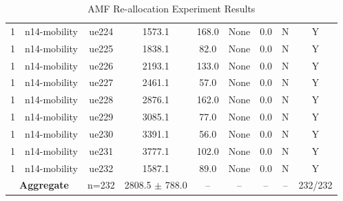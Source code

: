 \begin{table}[ht]
\begin{tabular}{|c|c|c|c|c|c|c|c|c|}
1 & n14-mobility & ue224 & 1573.1 & 168.0 & None & 0.0 & N & Y \\
1 & n14-mobility & ue225 & 1838.1 & 82.0 & None & 0.0 & N & Y \\
1 & n14-mobility & ue226 & 2193.1 & 133.0 & None & 0.0 & N & Y \\
1 & n14-mobility & ue227 & 2461.1 & 57.0 & None & 0.0 & N & Y \\
1 & n14-mobility & ue228 & 2876.1 & 162.0 & None & 0.0 & N & Y \\
1 & n14-mobility & ue229 & 3085.1 & 77.0 & None & 0.0 & N & Y \\
1 & n14-mobility & ue230 & 3391.1 & 56.0 & None & 0.0 & N & Y \\
1 & n14-mobility & ue231 & 3777.1 & 102.0 & None & 0.0 & N & Y \\
1 & n14-mobility & ue232 & 1587.1 & 89.0 & None & 0.0 & N & Y \\
\multicolumn{2}{|c|}{\textbf{Aggregate}} & n=232 & 2808.5 $\pm$ 788.0 & -- & -- & -- & -- & 232/232 \\
\hline
\end{tabular}
\caption{AMF Re-allocation Experiment Results}
\label{tab:amf_realloc}
\end{table}
